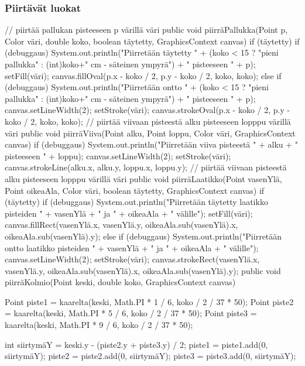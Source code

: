 \subsubsection{Piirtävät luokat}
\label{Piirtävät luokat}
\begin{javacode}
// piirtää pallukan pisteeseen p värillä väri
  public void piirräPallukka(Point p, Color väri, double koko, boolean täytetty,
      GraphicsContext canvas) {
    if (täytetty){
      if (debuggaus) System.out.println("Piirretään täytetty " + (koko < 15 ?
          "pieni pallukka" : (int)koko+" cm - säteinen ympyrä") + " pisteeseen " + p);
      setFill(väri);
      canvas.fillOval(p.x - koko / 2, p.y - koko / 2, koko, koko);
    } else {
      if (debuggaus) System.out.println("Piirretään ontto " + (koko < 15 ?
         "pieni pallukka" : (int)koko+" cm - säteinen ympyrä") + " pisteeseen " + p);
      canvas.setLineWidth(2);
      setStroke(väri);
      canvas.strokeOval(p.x - koko / 2, p.y - koko / 2, koko, koko);
    }
  }
  // piirtää viivaan pisteestä alku pisteeseen lopppu värillä väri
  public void piirräViiva(Point alku, Point loppu, Color väri, GraphicsContext canvas) {
    if (debuggaus) System.out.println("Piirretään viiva pisteestä " + alku +
        " pisteeseen " + loppu);
    canvas.setLineWidth(2);
    setStroke(väri);
    canvas.strokeLine(alku.x, alku.y, loppu.x, loppu.y);
  }
  // piirtää viivaan pisteestä alku pisteeseen lopppu värillä väri
  public void piirräLaatikko(Point vasenYlä, Point oikeaAla, Color väri, boolean täytetty,
      GraphicsContext canvas) {
    if (täytetty) {
      if (debuggaus) System.out.println("Piirretään täytetty laatikko pisteiden " + vasenYlä
          + " ja " + oikeaAla + " välille");
      setFill(väri);
      canvas.fillRect(vasenYlä.x, vasenYlä.y, oikeaAla.sub(vasenYlä).x, 
          oikeaAla.sub(vasenYlä).y);
    } else {
      if (debuggaus) System.out.println("Piirretään ontto laatikko pisteiden " + vasenYlä
          + " ja " + oikeaAla + " välille");
      canvas.setLineWidth(2);
      setStroke(väri);
      canvas.strokeRect(vasenYlä.x, vasenYlä.y, oikeaAla.sub(vasenYlä).x,
          oikeaAla.sub(vasenYlä).y);
    }
  }
  public void piirräKolmio(Point keski, double koko, GraphicsContext canvas) {
    Point piste1 = kaarelta(keski, Math.PI * 1 / 6, koko / 2 / 37 * 50);
    Point piste2 = kaarelta(keski, Math.PI * 5 / 6, koko / 2 / 37 * 50);
    Point piste3 = kaarelta(keski, Math.PI * 9 / 6, koko / 2 / 37 * 50);

    int siirtymäY = keski.y - (piste2.y + piste3.y) / 2;
    piste1 = piste1.add(0, siirtymäY);
    piste2 = piste2.add(0, siirtymäY);
    piste3 = piste3.add(0, siirtymäY);

}
\end{javacode}
